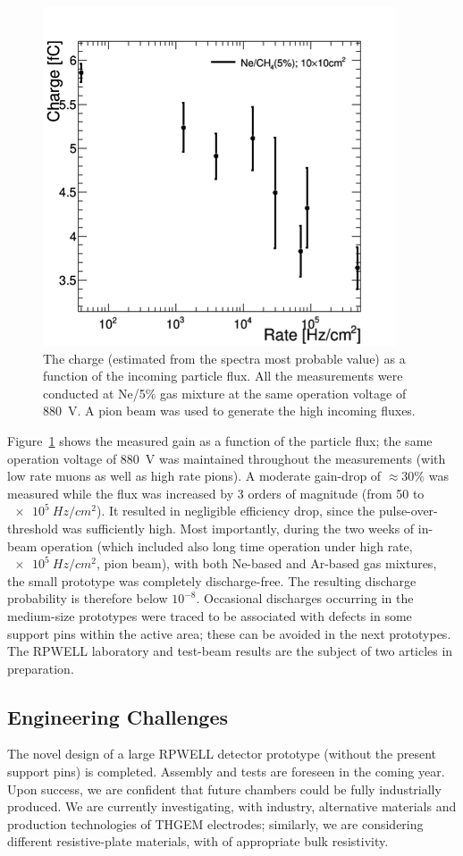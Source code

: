 \begin{figure}
	\centering
	\includegraphics[width=.5\textwidth]{Calorimeter/THGEM/charge_vs_rate.png}
	\caption{The charge (estimated from the spectra most probable value) as a function of the incoming particle flux.  All the measurements were conducted at Ne/5\% gas mixture at the same operation voltage of \SI{880}{V}. A pion beam was used to generate the high incoming fluxes.}
	\label{fig:Calorimeter:THGEM:chargeVsRate}
\end{figure}
Figure~\ref{fig:Calorimeter:THGEM:chargeVsRate} shows the measured gain as a function of the particle flux; the same operation voltage of \SI{880}{V} was maintained throughout the measurements (with low rate muons as well as high rate pions). A moderate gain-drop of $\approx 30\%$ was measured while the flux was increased by 3 orders of magnitude (from 50 to $\SI{e5}{Hz/cm^2}$). It resulted in negligible efficiency drop, since the pulse-over-threshold was sufficiently high.
Most importantly, during the two weeks of in-beam operation (which included also long time operation under high rate, $\SI{e5}{Hz/cm^2}$, pion beam), with both Ne-based and Ar-based gas mixtures, the small prototype was completely discharge-free. The resulting discharge probability is therefore below $10^{-8}$. Occasional discharges occurring in the medium-size prototypes were traced to be associated with defects in some support pins within the active area; these can be avoided in the next prototypes.
The RPWELL laboratory and test-beam results are the subject of two articles in preparation.


\subsection{Engineering Challenges}
The novel design of a large RPWELL detector prototype (without the present support pins) is completed. Assembly and tests are foreseen in the coming year. Upon success, we are confident that future chambers could be fully industrially produced.
We are currently investigating, with industry, alternative materials and production technologies of THGEM electrodes; similarly, we are considering different resistive-plate materials, with of appropriate bulk resistivity.

